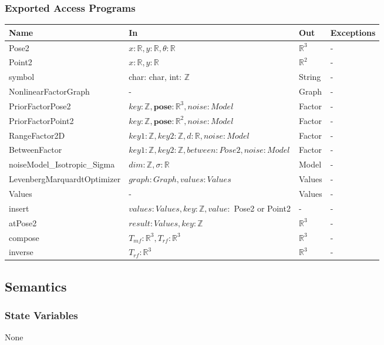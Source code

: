 \documentclass[12pt, titlepage]{article}
\begin{document}
\subsubsection{Exported Access Programs}

\begin{center}
\begin{tabular}{p{6cm} p{6cm} p{2cm} p{3cm}}
\hline
\textbf{Name} & \textbf{In} & \textbf{Out} & \textbf{Exceptions} \\
\hline
Pose2 & $x: \mathbb{R}, y: \mathbb{R}, \theta: \mathbb{R}$ & $\mathbb{R}^{3}$ & - \\
Point2 & $x: \mathbb{R}, y: \mathbb{R}$  & $\mathbb{R}^{2}$  & - \\
symbol & char: char, int: $\mathbb{Z}$  & String & - \\
NonlinearFactorGraph & - & Graph & - \\
PriorFactorPose2 & $key:\mathbb{Z}, \textbf{pose}: \mathbb{R}^3, noise: Model$ & Factor & - \\
PriorFactorPoint2 & $key:\mathbb{Z}, \textbf{pose}: \mathbb{R}^2, noise: Model$& Factor& - \\
RangeFactor2D &  $key1: \mathbb{Z}, key2: \mathbb{Z}, d: \mathbb{R}, noise: Model$  & Factor & - \\
BetweenFactor &  $key1: \mathbb{Z}, key2: \mathbb{Z}, between: Pose2, noise: Model$  & Factor & - \\
noiseModel\_Isotropic\_Sigma & $dim: \mathbb{Z}, \sigma: \mathbb{R}$ & Model & - \\
LevenbergMarquardtOptimizer & $graph: Graph, values: Values$ & Values & - \\
Values & - & Values & - \\
insert & $values: Values, key: \mathbb{Z}, value:$ Pose2 or Point2 & - & - \\
atPose2 & $result: Values, key: \mathbb{Z}$  & $\mathbb{R}^3$ & - \\
compose & $T_{mf}: \mathbb{R}^3, T_{rf}: \mathbb{R}^3$ & $\mathbb{R}^3$ & - \\
inverse &  $T_{rf}: \mathbb{R}^3$ & $\mathbb{R}^3$ & - \\
\hline
\end{tabular}
\end{center}

\subsection{Semantics}

\subsubsection{State Variables}
None
\end{document}
